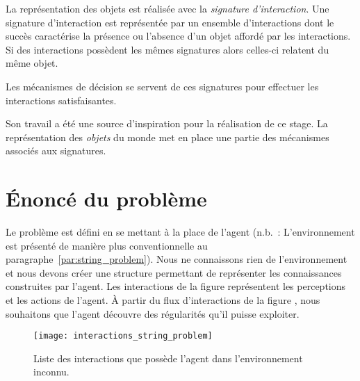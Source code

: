 \documentclass{llncs}
\begin{document}
La représentation des objets est réalisée avec la \emph{signature d'interaction}. Une signature d'interaction est représentée par un ensemble d'interactions dont le succès caractérise la présence ou l'absence d'un objet affordé par les interactions. Si des interactions possèdent les mêmes signatures alors celles-ci relatent du même objet. 

Les mécanismes de décision se servent de ces signatures pour effectuer les interactions satisfaisantes. 

Son travail a été une source d'inspiration pour la réalisation de ce stage. La représentation des \emph{objets} du monde met en place une partie des mécanismes associés aux signatures.

\section{Énoncé du problème}
Le problème est défini en se mettant à la place de l'agent (n.b.~: L'environnement est présenté de manière plus conventionnelle au paragraphe~\ref{par:string_problem}). Nous ne connaissons rien de l'environnement et nous devons créer une structure permettant de représenter les connaissances construites par l'agent. 
 Les interactions de la figure  représentent les perceptions et les actions de l'agent. 
À partir du flux d'interactions de la figure , nous souhaitons que l'agent découvre des régularités qu'il puisse exploiter. 



\begin{figure}
	\centering
	\texttt{[image: interactions\_string\_problem]}
	\caption{Liste des interactions que possède l'agent dans l'environnement inconnu. }
	\label{fig:interactions_string_problem}	
\end{figure}
\end{document}
